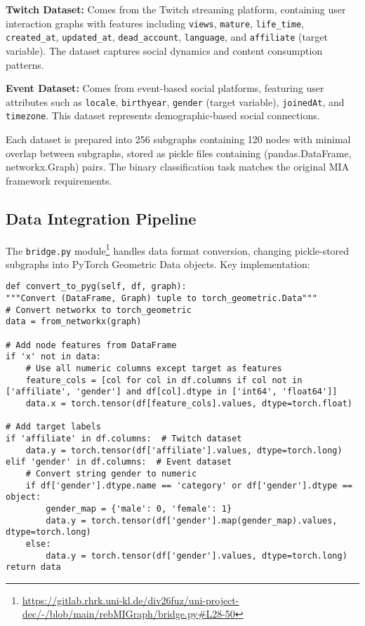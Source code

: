 \documentclass{article}
\begin{document}
\textbf{Twitch Dataset:} Comes from the Twitch streaming platform, containing user interaction graphs with features including \texttt{views}, \texttt{mature}, \texttt{life\_time}, \texttt{created\_at}, \texttt{updated\_at}, \texttt{dead\_account}, \texttt{language}, and \texttt{affiliate} (target variable). The dataset captures social dynamics and content consumption patterns.

\textbf{Event Dataset:} Comes from event-based social platforms, featuring user attributes such as \texttt{locale}, \texttt{birthyear}, \texttt{gender} (target variable), \texttt{joinedAt}, and \texttt{timezone}. This dataset represents demographic-based social connections.

Each dataset is prepared into 256 subgraphs containing 120 nodes with minimal overlap between subgraphs, stored as pickle files containing (pandas.DataFrame, networkx.Graph) pairs. The binary classification task matches the original MIA framework requirements.

\subsection{Data Integration Pipeline}
The \texttt{bridge.py} module\footnote{\url{https://gitlab.rhrk.uni-kl.de/div26fuz/uni-project-dec/-/blob/main/rebMIGraph/bridge.py\#L28-50}} handles data format conversion, changing pickle-stored subgraphs into PyTorch Geometric Data objects. Key implementation:
\begin{verbatim}
def convert_to_pyg(self, df, graph):
"""Convert (DataFrame, Graph) tuple to torch_geometric.Data"""
# Convert networkx to torch_geometric
data = from_networkx(graph)

# Add node features from DataFrame
if 'x' not in data:
    # Use all numeric columns except target as features
    feature_cols = [col for col in df.columns if col not in ['affiliate', 'gender'] and df[col].dtype in ['int64', 'float64']]
    data.x = torch.tensor(df[feature_cols].values, dtype=torch.float)

# Add target labels
if 'affiliate' in df.columns:  # Twitch dataset
    data.y = torch.tensor(df['affiliate'].values, dtype=torch.long)
elif 'gender' in df.columns:  # Event dataset
    # Convert string gender to numeric
    if df['gender'].dtype.name == 'category' or df['gender'].dtype == object:
        gender_map = {'male': 0, 'female': 1}
        data.y = torch.tensor(df['gender'].map(gender_map).values, dtype=torch.long)
    else:
        data.y = torch.tensor(df['gender'].values, dtype=torch.long)
return data
\end{verbatim}
\end{document}
